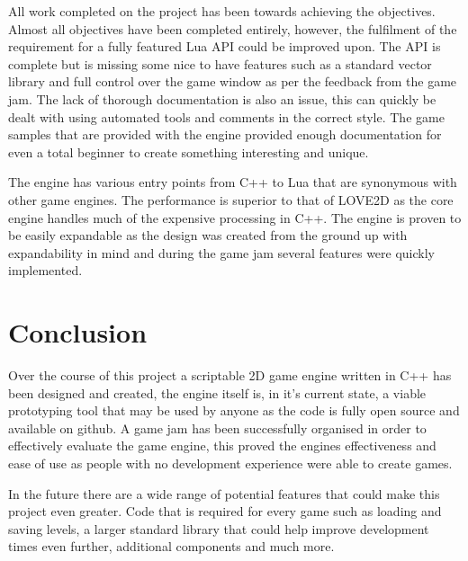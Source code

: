 \documentclass[11pt,a4paper,titlepage]{report}
\begin{document}
	All work completed on the project has been towards achieving the objectives. Almost all objectives have been completed entirely, however, the fulfilment of the requirement for a fully featured Lua API could be improved upon. The API is complete but is missing some nice to have features such as a standard vector library and full control over the game window as per the feedback from the game jam. The lack of thorough documentation is also an issue, this can quickly be dealt with using automated tools and comments in the correct style. The game samples that are provided with the engine provided enough documentation for even a total beginner to create something interesting and unique.

	The engine has various entry points from C++ to Lua that are synonymous with other game engines.	The performance is superior to that of LOVE2D as the core engine handles much of the expensive processing in C++. The engine is proven to be easily expandable as the design was created from the ground up with expandability in mind and during the game jam several features were quickly implemented.









\chapter{Conclusion}

	
	Over the course of this project a scriptable 2D game engine written in C++ has been designed and created, the engine itself is, in it's current state, a viable prototyping tool that may be used by anyone as the code is fully open source and available on github. A game jam has been successfully organised in order to effectively evaluate the game engine, this proved the engines effectiveness and ease of use as people with no development experience were able to create games. 


	In the future there are a wide range of potential features that could make this project even greater. Code that is required for every game such as loading and saving levels, a larger standard library that could help improve development times even further, additional components and much more.
\end{document}
